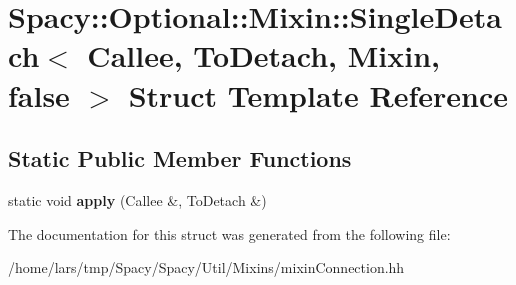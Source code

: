 \hypertarget{structSpacy_1_1Optional_1_1Mixin_1_1SingleDetach_3_01Callee_00_01ToDetach_00_01Mixin_00_01false_01_4}{}\section{Spacy\+:\+:Optional\+:\+:Mixin\+:\+:Single\+Detach$<$ Callee, To\+Detach, Mixin, false $>$ Struct Template Reference}
\label{structSpacy_1_1Optional_1_1Mixin_1_1SingleDetach_3_01Callee_00_01ToDetach_00_01Mixin_00_01false_01_4}
\subsection*{Static Public Member Functions}
\begin{DoxyCompactItemize}
\item 
static void {\bfseries apply} (Callee \&, To\+Detach \&)\hypertarget{structSpacy_1_1Optional_1_1Mixin_1_1SingleDetach_3_01Callee_00_01ToDetach_00_01Mixin_00_01false_01_4_ad1d0c04f703bf7236b59ffccdd001cb1}{}\label{structSpacy_1_1Optional_1_1Mixin_1_1SingleDetach_3_01Callee_00_01ToDetach_00_01Mixin_00_01false_01_4_ad1d0c04f703bf7236b59ffccdd001cb1}

\end{DoxyCompactItemize}


The documentation for this struct was generated from the following file\+:\begin{DoxyCompactItemize}
\item 
/home/lars/tmp/\+Spacy/\+Spacy/\+Util/\+Mixins/mixin\+Connection.\+hh\end{DoxyCompactItemize}
